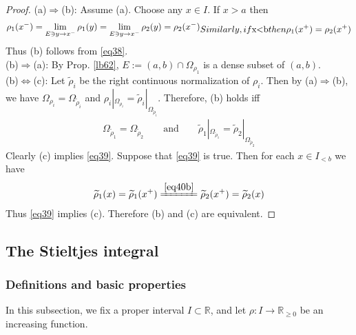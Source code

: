 \documentclass[12pt,b5paper,notitlepage]{article}
\theoremstyle{definition}
\theoremstyle{plain}
\newcommand{\wtd}{\widetilde}
\newcommand{\Rbb}{\mathbb R}
\numberwithin{equation}{section}
\begin{document}
\begin{proof}
(a)$\Rightarrow$(b): Assume (a). Choose any $x\in I$. If $x>a$ then
\begin{subequations}\label{eq40}
\begin{align}\label{eq40a}
\rho_1(x^-)=\lim_{E\ni y\rightarrow x^-}\rho_1(y)=\lim_{E\ni y\rightarrow x^-}\rho_2(y)=\rho_2(x^-)
\end{align}
Similarly, if $x<b$ then
\begin{align}\label{eq40b}
\rho_1(x^+)=\rho_2(x^+)
\end{align}
\end{subequations}
Thus (b) follows from \eqref{eq38}.\\[-1ex]

(b)$\Rightarrow$(a): By Prop. \ref{lb62}, $E:=(a,b)\cap\Omega_{\rho_1}$ is a dense subset of $(a,b)$.\\[-1ex]

(b)$\Leftrightarrow$(c): Let $\wtd\rho_i$ be the right continuous normalization of $\rho_i$. Then by (a)$\Rightarrow$(b), we have $\Omega_{\rho_i}=\Omega_{\wtd\rho_i}$ and $\rho_i|_{\Omega_{\rho_i}}=\wtd\rho_i|_{\Omega_{\wtd\rho_i}}$. Therefore, (b) holds iff
\begin{align}\label{eq39}
\Omega_{\wtd\rho_1}=\Omega_{\wtd\rho_2}\qquad \text{and}\qquad \wtd\rho_1|_{\Omega_{\wtd\rho_1} }=\wtd\rho_2|_{\Omega_{\wtd\rho_2} }
\end{align}
Clearly (c) implies \eqref{eq39}. Suppose that \eqref{eq39} is true. Then for each $x\in I_{<b}$ we have
\begin{align*}
\wtd\rho_1(x)=\wtd\rho_1(x^+)\xlongequal{\eqref{eq40b}}\wtd\rho_2(x^+)=\wtd\rho_2(x)
\end{align*}
Thus \eqref{eq39} implies (c). Therefore (b) and (c) are equivalent.
\end{proof}






\subsection{The Stieltjes integral}


\subsubsection{Definitions and basic properties}

In this subsection, we fix a proper interval $I\subset\Rbb$, and let $\rho:I\rightarrow\Rbb_{\geq0}$ be an increasing function.
\end{document}
